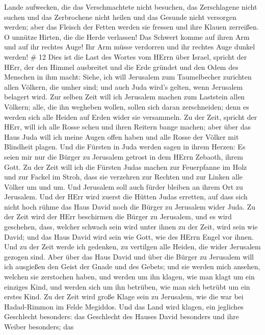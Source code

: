 Lande aufwecken, die das Verschmachtete nicht besuchen, das Zerschlagene
nicht suchen und das Zerbrochene nicht heilen und das Gesunde nicht
versorgen werden; aber das Fleisch der Fetten werden sie fressen und
ihre Klauen zerreißen.  O unnütze Hirten, die die Herde
verlassen! Das Schwert komme auf ihren Arm und auf ihr rechtes Auge! Ihr
Arm müsse verdorren und ihr rechtes Auge dunkel werden! \# 12
 Dies ist die Last des Wortes vom HErrn über Israel, spricht
der HErr, der den Himmel ausbreitet und die Erde gründet und den Odem
des Menschen in ihm macht:  Siehe, ich will Jerusalem zum
Taumelbecher zurichten allen Völkern, die umher sind; und auch Juda
wird's gelten, wenn Jerusalem belagert wird.  Zur selben
Zeit will ich Jerusalem machen zum Laststein allen Völkern; alle, die
ihn wegheben wollen, sollen sich daran zerschneiden; denn es werden sich
alle Heiden auf Erden wider sie versammeln.  Zu der Zeit,
spricht der HErr, will ich alle Rosse scheu und ihren Reitern bange
machen; aber über das Haus Juda will ich meine Augen offen haben und
alle Rosse der Völker mit Blindheit plagen.  Und die Fürsten
in Juda werden sagen in ihrem Herzen: Es seien mir nur die Bürger zu
Jerusalem getrost in dem HErrn Zebaoth, ihrem Gott.  Zu der
Zeit will ich die Fürsten Judas machen zur Feuerpfanne im Holz und zur
Fackel im Stroh, dass sie verzehren zur Rechten und zur Linken alle
Völker um und um. Und Jerusalem soll auch fürder bleiben an ihrem Ort zu
Jerusalem.  Und der HErr wird zuerst die Hütten Judas
erretten, auf dass sich nicht hoch rühme das Haus David noch die Bürger
zu Jerusalem wider Juda.  Zu der Zeit wird der HErr
beschirmen die Bürger zu Jerusalem, und es wird geschehen, dass, welcher
schwach sein wird unter ihnen zu der Zeit, wird sein wie David; und das
Haus David wird sein wie Gott, wie des HErrn Engel vor ihnen.
 Und zu der Zeit werde ich gedenken, zu vertilgen alle
Heiden, die wider Jerusalem gezogen sind.  Aber über das
Haus David und über die Bürger zu Jerusalem will ich ausgießen den Geist
der Gnade und des Gebets; und sie werden mich ansehen, welchen sie
zerstochen haben, und werden um ihn klagen, wie man klagt um ein
einziges Kind, und werden sich um ihn betrüben, wie man sich betrübt um
ein erstes Kind.  Zu der Zeit wird große Klage sein zu
Jerusalem, wie die war bei Hadad-Rimmon im Felde Megiddos. 
Und das Land wird klagen, ein jegliches Geschlecht besonders: das
Geschlecht des Hauses David besonders und ihre Weiber besonders; das
